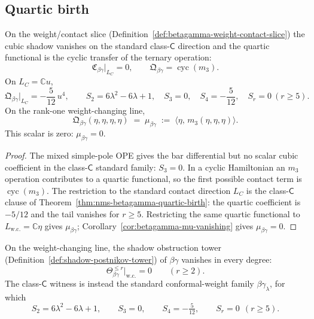 \subsection{Quartic birth}

\begin{theorem}
\label{thm:betagamma-quartic-birth}
\ClaimStatusProvedHere
{}
On the weight/contact slice
\textup{(}Definition~\textup{\ref{def:betagamma-weight-contact-slice}}\textup{)}
the cubic shadow vanishes on the standard class-$\mathsf C$ direction
and the quartic functional is the cyclic transfer of the ternary
operation:
\[
 \mathfrak{C}_{\beta\gamma}\big|_{L_C} = 0,
 \qquad
 \mathfrak{Q}_{\beta\gamma} = \operatorname{cyc}(m_3).
\]
On $L_C=\mathbb C u$,
\[
 \mathfrak{Q}_{\beta\gamma}\big|_{L_C}
 =
 -\frac{5}{12}\,u^4,
 \qquad
 S_2 = 6\lambda^2 - 6\lambda + 1,\quad
 S_3=0,\quad S_4=-\frac{5}{12},\quad S_r=0\ (r\ge5).
\]
On the rank-one weight-changing line,
\[
 \mathfrak{Q}_{\beta\gamma}(\eta,\eta,\eta,\eta)
 \;=\;
 \mu_{\beta\gamma}
 \;:=\;
 \langle \eta,\, m_3(\eta,\eta,\eta) \rangle.
\]
This scalar is zero: $\mu_{\beta\gamma}=0$.
\end{theorem}

\begin{proof}
The mixed simple-pole OPE gives the bar differential but no scalar
cubic coefficient in the class-$\mathsf C$ standard family:
$S_3=0$. In a cyclic Hamiltonian an $m_3$ operation contributes to a
quartic functional, so the first possible contact term is
$\operatorname{cyc}(m_3)$. The restriction to the standard contact
direction $L_C$ is the class-$\mathsf C$ clause of
Theorem~\ref{thm:nms-betagamma-quartic-birth}: the quartic coefficient
is $-5/12$ and the tail vanishes for $r\ge5$. Restricting the same
quartic functional to $L_{\mathrm{w.c.}}=\mathbb C\eta$ gives
$\mu_{\beta\gamma}$; Corollary~\ref{cor:betagamma-mu-vanishing}
gives $\mu_{\beta\gamma}=0$.\qedhere
\end{proof}

\begin{corollary}
\label{cor:betagamma-postnikov-termination}
\ClaimStatusProvedHere
{}
On the weight-changing line, the shadow obstruction tower
\textup{(}Definition~\textup{\ref{def:shadow-postnikov-tower})}
of $\beta\gamma$ vanishes in every degree:
\[
 \Theta_{\beta\gamma}^{\le r}\big|_{\mathrm{w.c.}} = 0
 \qquad (r \ge 2).
\]
The class-$\mathsf{C}$ witness is instead the standard
conformal-weight family $\beta\gamma_\lambda$, for which
\[
 S_2 = 6\lambda^2 - 6\lambda + 1,\qquad
 S_3 = 0,\qquad
 S_4 = -\tfrac{5}{12},\qquad
 S_r = 0 \ \ (r \ge 5).
\]
\end{corollary}

